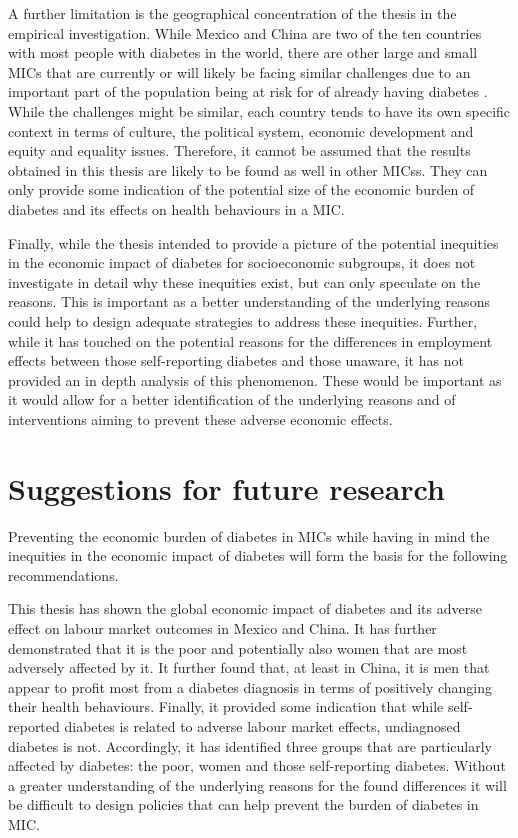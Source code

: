 A further limitation is the geographical concentration of the thesis in the empirical investigation. While Mexico and China are two of the ten countries with most people with diabetes in the world, there are other large and small \acp{MIC} that are currently or will likely be facing similar challenges due to an important part of the population being at risk for of already having diabetes \parencite{Risk2016}. While the challenges might be similar, each country tends to have its own specific context in terms of culture, the political system, economic development and equity and equality issues. Therefore, it cannot be assumed that the results obtained in this thesis are likely to be found as well in other \acp{MICs}. They can only provide some indication of the potential size of the economic burden of diabetes and its effects on health behaviours in a \ac{MIC}.

Finally, while the thesis intended to provide a picture of the potential inequities in the economic impact of diabetes for socioeconomic subgroups, it does not investigate in detail why these inequities exist, but can only speculate on the reasons. This is important as a better understanding of the underlying reasons could help to design adequate strategies to address these inequities. Further, while it has touched on the potential reasons for the differences in employment effects between those self-reporting diabetes and those unaware, it has not provided an in depth analysis of this phenomenon. These would be important as it would allow for a better identification of the underlying reasons and of interventions aiming to prevent these adverse economic effects. 



\section{Suggestions for future research}

Preventing the economic burden of diabetes in \acp{MIC} while having in mind the inequities in the economic impact of diabetes will form the basis for the following recommendations.

This thesis has shown the global economic impact of diabetes and its adverse effect on labour market outcomes in Mexico and China. It has further demonstrated that it is the poor and potentially also women that are most adversely affected by it. It further found that, at least in China, it is men that appear to profit most from a diabetes diagnosis in terms of positively changing their health behaviours. Finally, it provided some indication that while self-reported diabetes is related to adverse labour market effects, undiagnosed diabetes is not. Accordingly, it has identified three groups that are particularly affected by diabetes: the poor, women and those self-reporting diabetes. Without a greater understanding of the underlying reasons for the found differences it will be difficult to design policies that can help prevent the burden of diabetes in \ac{MIC}.

